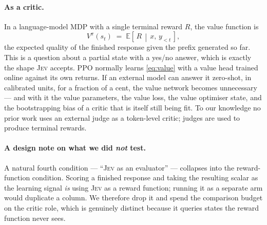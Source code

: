 \documentclass[11pt]{article}
\newcommand{\jev}{\textsc{Jev}}
\begin{document}
\paragraph{As a critic.} In a language-model MDP with a single terminal reward
$R$, the value function is
\begin{equation}
V^{\pi}(s_t) \;=\; \mathbb{E}\!\left[\, R \,\middle|\, x,\, y_{<t} \,\right],
\label{eq:value}
\end{equation}
the expected quality of the finished response given the prefix generated so far.
This is a question about a partial state with a yes/no answer, which is exactly
the shape \jev{} accepts. PPO normally learns \eqref{eq:value} with a value head
trained online against its own returns. If an external model can answer it
zero-shot, in calibrated units, for a fraction of a cent, the value network
becomes unnecessary --- and with it the value parameters, the value loss, the
value optimiser state, and the bootstrapping bias of a critic that is itself
still being fit. To our knowledge no prior work uses an external judge as a
token-level critic; judges are used to produce terminal rewards.

\paragraph{A design note on what we did \emph{not} test.} A natural fourth
condition --- ``\jev{} as an evaluator'' --- collapses into the reward-function
condition. Scoring a finished response and taking the resulting scalar as the
learning signal \emph{is} using \jev{} as a reward function; running it as a
separate arm would duplicate a column. We therefore drop it and spend the
comparison budget on the critic role, which is genuinely distinct because it
queries states the reward function never sees.
\end{document}
